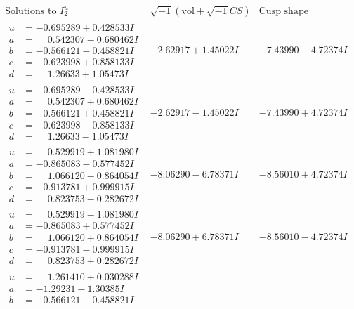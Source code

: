 \documentclass[1p]{elsarticle_modified}
\theoremstyle{definition}
\newcommand{\I}{\sqrt{-1}}
\begin{document}
$$\begin{array}{c|c|c}  
\text{Solutions to }I^u_{2}& \I (\text{vol} + \sqrt{-1}CS) & \text{Cusp shape}\\
 \hline 
\begin{aligned}
u &= -0.695289 + 0.428533 I \\
a &= \phantom{-}0.542307 - 0.680462 I \\
b &= -0.566121 - 0.458821 I \\
c &= -0.623998 + 0.858133 I \\
d &= \phantom{-}1.26633 + 1.05473 I\end{aligned}
 & -2.62917 + 1.45022 I & -7.43990 - 4.72374 I \\ \hline\begin{aligned}
u &= -0.695289 - 0.428533 I \\
a &= \phantom{-}0.542307 + 0.680462 I \\
b &= -0.566121 + 0.458821 I \\
c &= -0.623998 - 0.858133 I \\
d &= \phantom{-}1.26633 - 1.05473 I\end{aligned}
 & -2.62917 - 1.45022 I & -7.43990 + 4.72374 I \\ \hline\begin{aligned}
u &= \phantom{-}0.529919 + 1.081980 I \\
a &= -0.865083 - 0.577452 I \\
b &= \phantom{-}1.066120 - 0.864054 I \\
c &= -0.913781 + 0.999915 I \\
d &= \phantom{-}0.823753 - 0.282672 I\end{aligned}
 & -8.06290 - 6.78371 I & -8.56010 + 4.72374 I \\ \hline\begin{aligned}
u &= \phantom{-}0.529919 - 1.081980 I \\
a &= -0.865083 + 0.577452 I \\
b &= \phantom{-}1.066120 + 0.864054 I \\
c &= -0.913781 - 0.999915 I \\
d &= \phantom{-}0.823753 + 0.282672 I\end{aligned}
 & -8.06290 + 6.78371 I & -8.56010 - 4.72374 I \\ \hline\begin{aligned}
u &= \phantom{-}1.261410 + 0.030288 I \\
a &= -1.29231 - 1.30385 I \\
b &= -0.566121 - 0.458821 I \\

\end{aligned}
\end{array}$$
\end{document}
